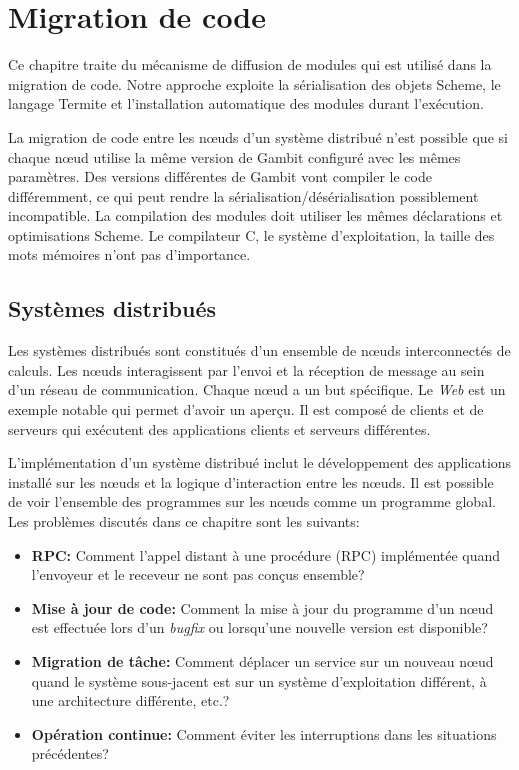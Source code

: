 \chapter{Migration de code}
\label{ch:task_migration}

Ce chapitre traite du mécanisme de diffusion de modules qui est utilisé dans
la migration de code. Notre approche exploite la sérialisation des objets
Scheme, le langage Termite et l'installation automatique des modules durant
l'exécution.

La migration de code entre les nœuds d'un système distribué n'est possible
que si chaque nœud utilise la même version de Gambit configuré avec les
mêmes paramètres. Des versions différentes de Gambit vont compiler le code
différemment, ce qui peut rendre la sérialisation/désérialisation possiblement
incompatible. La compilation des modules doit utiliser les mêmes déclarations
et optimisations Scheme. Le compilateur C, le système d'exploitation, la taille
des mots mémoires n'ont pas d'importance.

\section{Systèmes distribués}

Les systèmes distribués sont constitués d'un ensemble de nœuds interconnectés
de calculs. Les nœuds interagissent par l'envoi et la réception de message
au sein d'un réseau de communication. Chaque nœud a un but spécifique. Le
\textit{Web} est un exemple notable qui permet d'avoir un aperçu.
Il est composé de clients et de serveurs qui exécutent
des applications clients et serveurs différentes.

L'implémentation d'un système distribué inclut le développement des applications
installé sur les nœuds et la logique d'interaction entre les nœuds. Il est
possible de voir l'ensemble des programmes sur les nœuds comme un programme
global. Les problèmes discutés dans ce chapitre sont les suivants:

\begin{itemize}

  \item {\bf RPC:} Comment l'appel distant à une procédure (RPC)
    implémentée quand l'envoyeur et le receveur ne sont pas conçus
    ensemble?

  \item {\bf Mise à jour de code:} Comment la mise à jour du programme d'un
    nœud est effectuée lors d'un \textit{bugfix} ou lorsqu'une nouvelle
    version est disponible?

  \item {\bf Migration de tâche:} Comment déplacer un service sur un nouveau
    nœud quand le système sous-jacent est sur un système d'exploitation
    différent, à une architecture différente, etc.?

  \item {\bf Opération continue:} Comment éviter les interruptions dans les
    situations précédentes?

\end{itemize}

